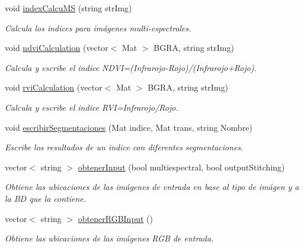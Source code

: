 \begin{DoxyCompactItemize}
void \mbox{\hyperlink{classIndexCalculation_a9c19fb3bdd84afb8769c90a1e31857b3}{index\+Calcu\+MS}} (string str\+Img)
\begin{DoxyCompactList}\small\item\em Calcula los indices para imágenes multi-\/espectrales. \end{DoxyCompactList}\item 
void \mbox{\hyperlink{classIndexCalculation_a4d727b91eeb0676b3ffcfaf26ec02a32}{ndvi\+Calculation}} (vector$<$ Mat $>$ B\+G\+RA, string str\+Img)
\begin{DoxyCompactList}\small\item\em Calcula y escribe el indice N\+D\+VI=(Infrarojo-\/\+Rojo)/(Infrarojo+\+Rojo). \end{DoxyCompactList}\item 
void \mbox{\hyperlink{classIndexCalculation_abd44fe3dd27ccd9641f29152fdf19a2e}{rvi\+Calculation}} (vector$<$ Mat $>$ B\+G\+RA, string str\+Img)
\begin{DoxyCompactList}\small\item\em Calcula y escribe el indice R\+VI=Infrarojo/\+Rojo. \end{DoxyCompactList}\item 
void \mbox{\hyperlink{classIndexCalculation_ae6a53e31c25458fd8c189e21fb89d80a}{escribir\+Segmentaciones}} (Mat indice, Mat trans, string Nombre)
\begin{DoxyCompactList}\small\item\em Escribe los resultados de un indice con diferentes segmentaciones. \end{DoxyCompactList}\item 
vector$<$ string $>$ \mbox{\hyperlink{classIndexCalculation_a65a88228b2caf575cbbac793a03d1dd6}{obtener\+Input}} (bool multiespectral, bool output\+Stitching)
\begin{DoxyCompactList}\small\item\em Obtiene las ubicaciones de las imágenes de entrada en base al tipo de imágen y a la BD que la contiene. \end{DoxyCompactList}\item 
vector$<$ string $>$ \mbox{\hyperlink{classIndexCalculation_aacf5294ab87007a511f9f9e9772855af}{obtener\+R\+G\+B\+Input}} ()
\begin{DoxyCompactList}\small\item\em Obtiene las ubicaciones de las imágenes R\+GB de entrada. \end{DoxyCompactList}\item 

\end{DoxyCompactItemize}
